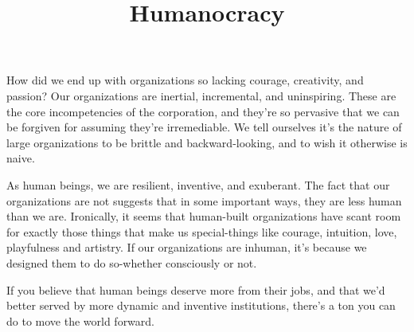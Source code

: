 \documentclass[ebook,12pt,oneside,openany]{memoir}
\begin{document}
\title{Humanocracy}
\maketitle

How did we end up with organizations so lacking courage, creativity, and passion?
Our organizations are inertial, incremental, and uninspiring. These are the core incompetencies of the corporation, and they're so pervasive that we can be forgiven for assuming they're irremediable.
We tell ourselves it's the nature of large organizations to be brittle and backward-looking, and to wish it otherwise is naive.

As human beings, we are resilient, inventive, and exuberant. The fact that our organizations are not suggests that in some important ways, they are less human than we are.
Ironically, it seems that human-built organizations have scant room for exactly those things that make us special-things like courage, intuition, love, playfulness and artistry.
If our organizations are inhuman, it's because we designed them to do so-whether consciously or not. 

If you believe that human beings deserve more from their jobs, and that we'd better served by more dynamic and inventive institutions, there's a ton you can do to move the world forward.
\end{document}
